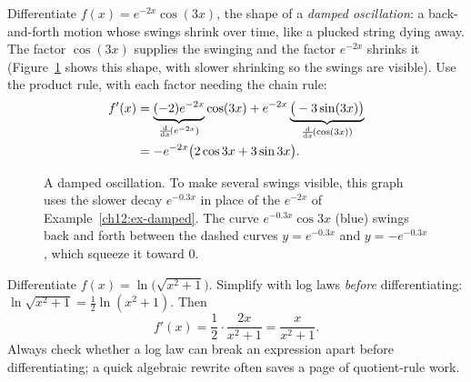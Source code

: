 \begin{example}
\label{ch12:ex-damped}
Differentiate $f(x) = e^{-2x}\cos(3x)$, the shape of a \emph{damped
oscillation}: a back-and-forth motion whose swings shrink over time, like a
plucked string dying away. The factor $\cos(3x)$ supplies the swinging and the
factor $e^{-2x}$ shrinks it (Figure~\ref{ch12:fig-damped} shows this shape,
with slower shrinking so the swings are visible).
Use the product rule, with each factor needing the chain rule:
\begin{align*}
   f'(x) &= \underbrace{(-2)e^{-2x}}_{\frac{\mathrm{d}}{\mathrm{d} x}\!\left(e^{-2x}\right)}\cos(3x)
         + e^{-2x}\underbrace{\big(-3\sin(3x)\big)}_{\frac{\mathrm{d}}{\mathrm{d} x}\!\left(\cos(3x)\right)} \\
         &= -e^{-2x}\big(2\cos 3x + 3\sin 3x\big).
\end{align*}
\end{example}

\begin{figure}[htbp]
\centering
{}
\caption{A damped oscillation. To make several swings visible, this graph uses
the slower decay $e^{-0.3x}$ in place of the $e^{-2x}$ of
Example~\ref{ch12:ex-damped}. The curve $e^{-0.3x}\cos 3x$ (blue) swings back
and forth between the dashed curves $y=e^{-0.3x}$ and $y=-e^{-0.3x}$, which
squeeze it toward $0$.}
\label{ch12:fig-damped}
\end{figure}

\begin{example}
\label{ch12:ex-log-comp}
Differentiate $f(x) = \ln\!\big(\sqrt{x^2+1}\big)$. Simplify with log laws
\emph{before} differentiating: $\ln\sqrt{x^2+1} = \tfrac12\ln(x^2+1)$. Then
\[
   f'(x) = \frac12\cdot\frac{2x}{x^2+1} = \frac{x}{x^2+1}.
\]
Always check whether a log law can break an expression apart before differentiating;
a quick algebraic rewrite often saves a page of quotient-rule work.
\end{example}

